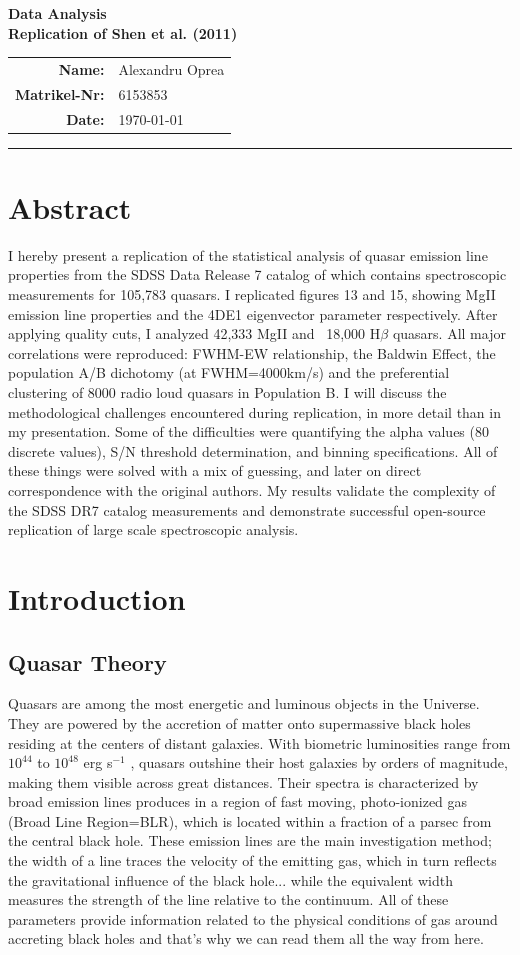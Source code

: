 \documentclass[11pt,a4paper]{article}
\newcommand{\Course}{Data Analysis}
\newcommand{\Assignment}{Replication of Shen et al. (2011)}
\newcommand{\Name}{Alexandru Oprea}
\newcommand{\StudentID}{6153853}
\newcommand{\DateSubmitted}{\today}
\renewcommand{\maketitle}{
  \begin{center}
    {\LARGE\bfseries \Course}\\[6pt]
    {\large\bfseries \Assignment}\\[12pt]
    \begin{tabular}{rl}
      \textbf{Name:} & \Name \\
      \textbf{Matrikel-Nr:} & \StudentID \\
      \textbf{Date:} & \DateSubmitted
    \end{tabular}
    \vspace{10pt}
    \hrule
  \end{center}
}
\begin{document}
\maketitle
\section{Abstract}

I hereby present a replication of the statistical analysis of quasar emission line properties from the SDSS Data Release 7 catalog of \cite{shen2011} which contains spectroscopic measurements for 105,783 quasars. I replicated figures 13 and 15, showing MgII emission line properties and the 4DE1 eigenvector parameter respectively. After applying quality cuts, I analyzed 42,333 MgII and ~18,000 H$\beta$ quasars. All major correlations were reproduced: FWHM-EW relationship, the Baldwin Effect, the population A/B dichotomy (at FWHM=4000km/s) and the preferential clustering of 8000 radio loud quasars in Population B. I will discuss the methodological challenges encountered during replication, in more detail than in my presentation. Some of the difficulties were quantifying the alpha values (80 discrete values), S/N threshold determination, and binning specifications. All of these things were solved with a mix of guessing, and later on direct correspondence with the original authors. My results validate the complexity of the SDSS DR7 catalog measurements and demonstrate successful open-source replication of large scale spectroscopic analysis. 

\section{Introduction}

\subsection{Quasar Theory}
Quasars are among the most energetic and luminous objects in the Universe. They are powered by the accretion of matter onto supermassive black holes residing at the centers of distant galaxies. With biometric luminosities range from $10^{44}$ to $10^{48}$ erg s$^{-1}$ , quasars outshine their host galaxies by orders of magnitude, making them visible across great distances. Their spectra is characterized by broad emission lines produces in a region of fast moving, photo-ionized gas (Broad Line Region=BLR), which is located within a fraction of a parsec from the central black hole. These emission lines are the main investigation method; the width of a line traces the velocity of the emitting gas, which in turn reflects the gravitational influence of the black hole... while the equivalent width measures the strength of the line relative to the continuum. All of these parameters provide information related to the physical conditions of gas around accreting black holes and that's why we can read them all the way from here.
\end{document}
